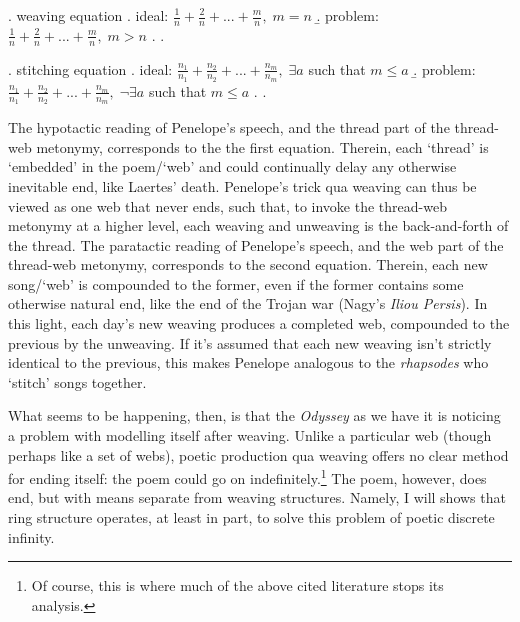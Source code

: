\documentclass[12pt]{article}
\begin{document}
\ex. weaving equation
\a. ideal: \begin{math} \frac{1}{n} + \frac{2}{n} + ... + \frac{m}{n}, \; m = n \end{math}
\b. problem: \begin{math} \frac{1}{n} + \frac{2}{n} + ... + \frac{m}{n}, \; m > n \end{math}
\z. \z. 

\ex. stitching equation
\a. ideal: \begin{math} \frac{n_1}{n_1} + \frac{n_2}{n_2} + ... + \frac{n_m}{n_m}, \; \exists a \end{math} such that \begin{math} m \leq a \end{math}
\b. problem: \begin{math} \frac{n_1}{n_1} + \frac{n_2}{n_2} + ... + \frac{n_m}{n_m}, \; \neg \exists a \end{math} such that \begin{math} m \leq a \end{math}
\z. \z. 

The hypotactic reading of Penelope's speech, and the thread part of the thread-web metonymy, corresponds to the the first equation. Therein, each `thread' is `embedded' in the poem/`web' and could continually delay any otherwise inevitable end, like Laertes' death. Penelope's trick qua weaving can thus be viewed as one web that never ends, such that, to invoke the thread-web metonymy at a higher level, each weaving and unweaving is the back-and-forth of the thread. The paratactic reading of Penelope's speech, and the web part of the thread-web metonymy, corresponds to the second equation. Therein, each new song/`web' is compounded to the former, even if the former contains some otherwise natural end, like the end of the Trojan war (Nagy's \textit{Iliou Persis}). In this light, each day's new weaving produces a completed web, compounded to the previous by the unweaving. If it's assumed that each new weaving isn't strictly identical to the previous, this makes Penelope analogous to the \textit{rhapsodes} who `stitch' songs together.

What seems to be happening, then, is that the \textit{Odyssey} as we have it is noticing a problem with modelling itself after weaving. Unlike a particular web (though perhaps like a set of webs), poetic production qua weaving offers no clear method for ending itself: the poem could go on indefinitely.\footnote{ Of course, this is where much of the above cited literature stops its analysis.} The poem, however, does end, but with means separate from weaving structures. Namely, I will shows that ring structure operates, at least in part, to solve this problem of poetic discrete infinity.
\end{document}

